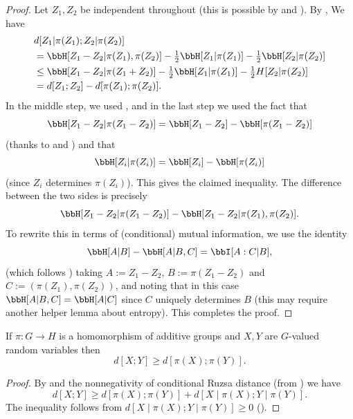 \begin{proof}\leanok
  Let $Z_1,Z_2$ be independent throughout (this is possible by  and ).  By , We have
  \begin{align*}
    & d[Z_1  |\pi(Z_1); Z_2 |\pi(Z_2)] \\
    & = \bbH[Z_1 - Z_2 | \pi(Z_1),\pi(Z_2)] - \tfrac{1}{2} \bbH[Z_1 | \pi(Z_1)] - \tfrac{1}{2} \bbH[Z_2 | \pi(Z_2)] \\
    & \leq  \bbH[Z_1 - Z_2 | \pi(Z_1+Z_2)]  - \tfrac{1}{2} \bbH[Z_1 | \pi(Z_1)] - \tfrac{1}{2}H[Z_2 | \pi(Z_2)] \\
    & = d[Z_1;Z_2] - d[\pi(Z_1);\pi(Z_2)].
  \end{align*}
  In the middle step, we used , and in the last step we used the fact that
  \[\bbH[Z_1 - Z_2 |  \pi(Z_1-Z_2)] = \bbH[Z_1 - Z_2] - \bbH[\pi(Z_1-Z_2)]\]
  (thanks to  and ) and that
  \[\bbH[Z_i| \pi(Z_i)] = \bbH[Z_i] - \bbH[\pi(Z_i)]\] (since $Z_i$ determines $\pi(Z_i)$).
  This gives the claimed inequality. The difference between the two sides is precisely
  \[\bbH[Z_1 - Z_2  | \pi(Z_1 - Z_2)] - \bbH[Z_1 - Z_2  | \pi(Z_1),\pi(Z_2)].\]
  To rewrite this in terms of (conditional) mutual information, we use the identity
  \[\bbH[A|B] - \bbH[A | B,C] = \bbI[A : C | B],\]
  (which follows )
  taking
  $A := Z_1 - Z_2$, $B := \pi(Z_1 - Z_2)$ and $C := (\pi(Z_1),\pi(Z_{2}))$, and noting that in this case $\bbH[A | B,C] = \bbH[A | C]$ since $C$ uniquely determines $B$ (this may require another helper lemma about entropy).
  This completes the proof.
\end{proof}


\begin{corollary}\label{fibring-ineq}
  \leanok
If $\pi:G\to H$ is a homomorphism of additive groups and $X,Y$ are $G$-valued random variables then
\[d[X;Y]\geq d[\pi(X);\pi(Y)].\]
\end{corollary}

\begin{proof}
\leanok
By  and the nonnegativity of conditional Ruzsa distance (from ) we have
\[d[X;Y]\geq d[\pi(X);\pi(Y)]+d[X\mid \pi(X);Y\mid \pi(Y)].\]
The inequality follows from $d[X\mid \pi(X);Y\mid \pi(Y)]\geq 0$ ().
\end{proof}


